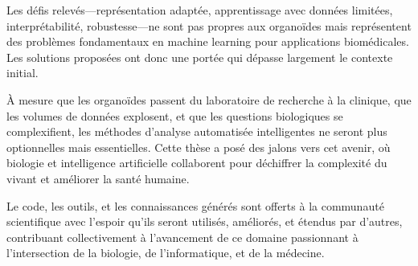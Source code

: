 Les défis relevés—représentation adaptée, apprentissage avec données limitées, interprétabilité, robustesse—ne sont pas propres aux organoïdes mais représentent des problèmes fondamentaux en machine learning pour applications biomédicales. Les solutions proposées ont donc une portée qui dépasse largement le contexte initial.

À mesure que les organoïdes passent du laboratoire de recherche à la clinique, que les volumes de données explosent, et que les questions biologiques se complexifient, les méthodes d'analyse automatisée intelligentes ne seront plus optionnelles mais essentielles. Cette thèse a posé des jalons vers cet avenir, où biologie et intelligence artificielle collaborent pour déchiffrer la complexité du vivant et améliorer la santé humaine.

Le code, les outils, et les connaissances générés sont offerts à la communauté scientifique avec l'espoir qu'ils seront utilisés, améliorés, et étendus par d'autres, contribuant collectivement à l'avancement de ce domaine passionnant à l'intersection de la biologie, de l'informatique, et de la médecine.
